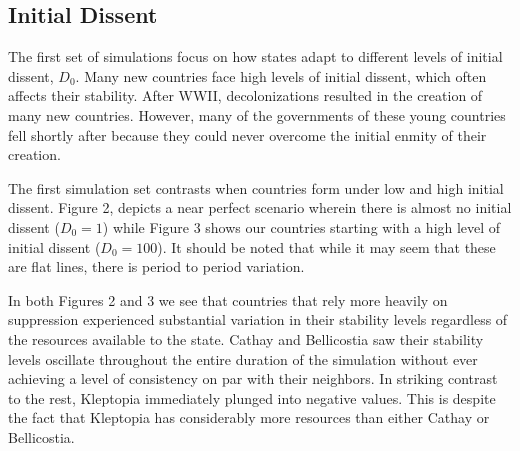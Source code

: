\documentclass[12pt]{article}
\begin{document}
\begin{spacing}{1.5}
\subsection{Initial Dissent}

The first set of simulations focus on how states adapt to different levels of initial dissent, $D_0$. Many new countries face high levels of initial dissent, which often affects their stability. After WWII, decolonizations resulted in the creation of many new countries. However, many of the governments of these young countries fell shortly after because they could never overcome the initial enmity of their creation. 

The first simulation set contrasts when countries form under low and high initial dissent. Figure 2, depicts a near perfect scenario wherein there is almost no initial dissent ($D_0 = 1$) while Figure 3 shows our countries starting with a high level of initial dissent ($D_0 = 100$). It should be noted that while it may seem that these are flat lines, there is period to period variation.  

In both Figures 2 and 3 we see that countries that rely more heavily on suppression experienced substantial variation in their stability levels regardless of the resources available to the state. Cathay and Bellicostia saw their stability levels oscillate throughout the entire duration of the simulation without ever achieving a level of consistency on par with their neighbors. In striking contrast to the rest, Kleptopia immediately plunged into negative values. This is despite the fact that Kleptopia has considerably more resources than either Cathay or Bellicostia.  




\end{spacing}
\end{document}
